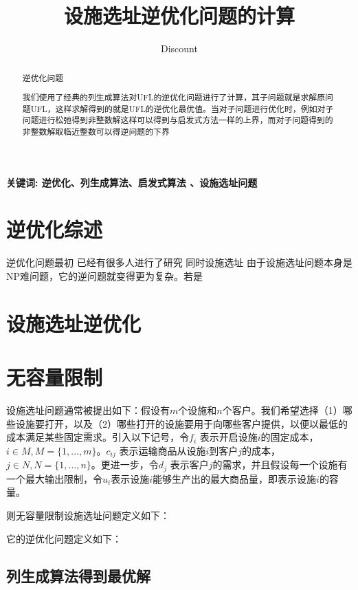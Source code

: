 \documentclass[UTF8]{article}
\author {Dis\cdot count}
\title {设施选址逆优化问题的计算}
\date{}
\begin{document}
    \maketitle

\begin{abstract}

逆优化问题

我们使用了经典的列生成算法对UFL的逆优化问题进行了计算，其子问题就是求解原问题UFL，这样求解得到的就是UFL的逆优化最优值。当对子问题进行优化时，例如对子问题进行松弛得到非整数解这样可以得到与启发式方法一样的上界，而对子问题得到的非整数解取临近整数可以得逆问题的下界


\end{abstract}

\qquad \textbf{关键词: 逆优化、列生成算法、启发式算法 、设施选址问题}

\section{逆优化综述}  %

逆优化问题最初
已经有很多人进行了研究
同时设施选址
由于设施选址问题本身是NP难问题，它的逆问题就变得更为复杂。若是

\section{设施选址逆优化}

\section{无容量限制}

设施选址问题通常被提出如下：假设有$m$个设施和$n$个客户。我们希望选择（1）哪些设施要打开，以及（2）哪些打开的设施要用于向哪些客户提供，以便以最低的成本满足某些固定需求。引入以下记号，令$f_i$ 表示开启设施$i$的固定成本，$i \in M, M=\{1,\ldots,m\}$。$c_{ij}$ 表示运输商品从设施$i$到客户$j$的成本，$j \in N, N=\{1,\ldots,n\}$。更进一步，令$d_j$ 表示客户$j$的需求，并且假设每一个设施有一个最大输出限制，令$u_i$表示设施$i$能够生产出的最大商品量，即表示设施$i$的容量。

则无容量限制设施选址问题定义如下：


它的逆优化问题定义如下：


\subsection{列生成算法得到最优解}
\end{document}

